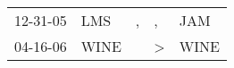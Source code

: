 \begin{supertabular}{p{0.07\textwidth}p{0.06\textwidth}p{0.02\textwidth}p{0.02\textwidth}p{0.06\textwidth}}
 12-31-05\textsuperscript{} &   LMS\textsuperscript{} &  , &             , &   JAM\textsuperscript{} \\
 04-16-06\textsuperscript{} &  WINE\textsuperscript{} &    &  \textgreater &  WINE\textsuperscript{} \\
\end{supertabular}
